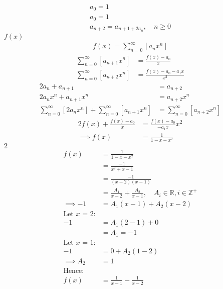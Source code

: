 \documentclass{article}
\begin{document}
\begin{align*}
a_0= 1 \\
a_0= 1 \\
a_{n+  2} =  a_{n+  1 +  2 a_n}, \quad n \geq 0
\end{align*}
$f(x)$
\begin{align}
f\left( x \right)= \sum^{\infty}_{n= 0}   \left[ a_nx^n \right] \label{eq:pow-gen-func-np0}
\end{align}
\begin{align}
    \sum^{\infty}_{n= 0}  \left[ a_{n+  1} x^n \right] &= \frac{f\left( x \right)- a_0}{x} \label{eq:pow-gen-func-np1} \\
\sum^{\infty}_{n= 0}  \left[ a_{n+  2} x^n \right]  &= \frac{f\left( x \right) - a_0 - a_1x}{x^2} \label{eq:pow-gen-func-np2}
\end{align}
\begin{align}
    2a_n +  a_{n+  1 }&= a_{n+  2} \nonumber \\
    2a_nx^n +  a_{n+  1 } x^n &= a_{n+  2} x^n \nonumber \\
    \sum^{\infty}_{n= 0}   \left[ 2a_nx^n \right] + \sum^{\infty}_{n= 0}   \left[  a_{n+  1 } x^n  \right]   &= \sum^{\infty}_{n= 0}   \left[ a_{n+  2} x^n   \right] \label{eq:series-rep-pow-example}
\end{align}
\begin{align}
2f\left( x \right) +  \frac{f\left( x \right)- a_0}{x} &= \frac{f\left( x \right)- a_0}{- a_1x}x^2 \nonumber \\
\implies  f\left( x \right) &=  \frac{1}{1- x- x^2} \label{eq:power-series-form-example}
\end{align}
$2$
\begin{align*}
    f\left( x \right)&= \frac{1}{1- x- x^2}\\
&= \frac{- 1}{x^2 +  x -  1}\\
&= \frac{- 1}{\left( x- 2 \right)\left( x- 1 \right)}\\
&= \frac{A_1}{x- 2}+  \frac{A_2}{x- 1}, \quad A_i \in \mathbb{R}, i \in \mathbb{Z}^+ \\
 \implies  - 1 &= A_1\left( x- 1 \right) +  A_2\left( x- 2 \right)\\
 \text{Let $x$ = 2:}\\
 - 1&= A_1\left( 2-1 \right) +  0 \\
&= A_1 = - 1 \\
 \text{Let $x$ = 1:}\\
 - 1 &=  0 +  A_2 \left( 1- 2 \right) \\
 \implies  A_2&= 1 \\
 \text{Hence:}\\
 f\left( x \right)&=    \frac{1}{x- 1} - \frac{1}{x- 2}
\end{align*}
\end{document}
